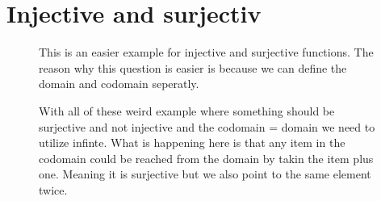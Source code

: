 \documentclass[a5paper]{article}
\begin{document}
\section*{Injective and surjectiv}
\begin{figure}[ht]
	\centering
	\caption*{This is an easier example for injective and surjective functions. The reason why this question is easier is because we can define the domain and codomain seperatly.
	}\label{fig:2017_1-1-1}
\end{figure}
\begin{figure}[ht]
	\centering
	\caption*{With all of these weird example where something should be surjective and not injective and the codomain = domain we need to utilize infinte. What is happening here is that any item in the codomain could be reached from the domain by takin the item plus one. Meaning it is surjective but we also point to the same element twice. 
	}\label{fig:2017_1-3-1}
\end{figure}
\end{document}
